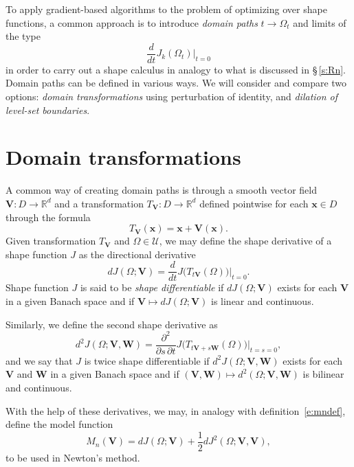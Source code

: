 \documentclass{article}
\theoremstyle{remark}
\numberwithin{equation}{section}
\newcommand{\RR}{\mathbb{R}}
\let\bs\boldsymbol
\begin{document}
To apply gradient-based algorithms to the problem of optimizing over shape functions, a common approach is to introduce \textit{domain paths} $t\to\Omega_t$ and limits of the type
%
\begin{equation}
\frac d{dt}J_k(\Omega_t)\big|_{t=0}
\end{equation}
%
in order to carry out a shape calculus in analogy to what is discussed in §\,\ref{s:Rn}.
Domain paths can be defined in various ways.
We will consider and compare two options: \textit{domain transformations} using perturbation of identity, and \textit{dilation of level-set boundaries}.

\section{Domain transformations}

A common way of creating domain paths is through a smooth vector field $\bs V\colon  D\to\RR^d$ and a transformation $T_{\bs V}:D\to\RR^d$ defined pointwise for each $\bs x\in D$ through the formula
%
\begin{equation}\label{e:TVdef}
T_{\bs V}(\bs x) = \bs x + \bs V(\bs x).
\end{equation}
%
Given transformation $T_{\bs V}$ and $\Omega\in\mathcal U$, we may define the shape derivative of a shape function $J$ as the directional derivative
%
\begin{equation}\label{e:dJtrans}
dJ(\Omega;\bs V) = \frac d{dt} J\bigl(T_{t\bs V}(\Omega)\bigr)\big|_{t=0}.      
\end{equation}
%
Shape function $J$ is said to be \textit{shape differentiable} if $dJ(\Omega; \bs V)$ exists for each $\bs V$ in a given Banach space and if $\bs V\mapsto dJ(\Omega;\bs V)$ is linear and continuous.

Similarly, we define the second shape derivative as 
%
\begin{equation}\label{e:d2Jtrans}
d^2 J(\Omega;\bs V, \bs W) = \frac{\partial^2}{\partial s\,\partial t} J\bigl(T_{t\bs V + s\bs W}(\Omega)\bigr)\big|_{t=s=0},
\end{equation}
%
and we say that $J$ is twice shape differentiable if $d^2J(\Omega; \bs V, \bs W)$ exists for each $\bs V$ and $\bs W$ in a given Banach space and if $(\bs V, \bs W)\mapsto d^2(\Omega; \bs V, \bs W)$ is bilinear and continuous.

With the help of these derivatives, we may, in analogy with definition~\eqref{e:mndef}, define the model function
%
\begin{equation}
M_n(\bs V) = dJ(\Omega; \bs V) + \frac12 dJ^2(\Omega; \bs V, \bs V),
\end{equation}
%
to be used in Newton’s method.
\end{document}
